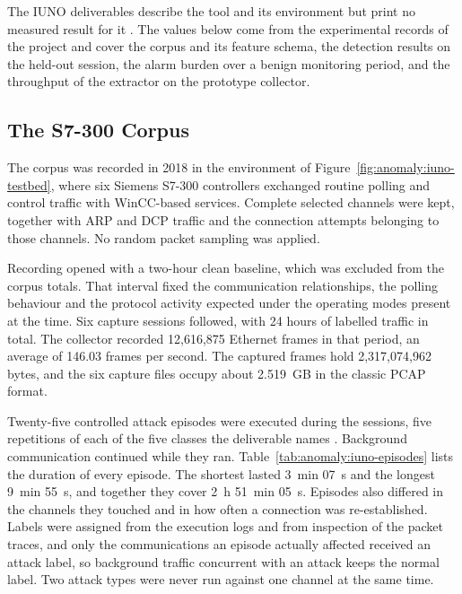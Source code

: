 The IUNO deliverables describe the tool and its environment but print no measured result for it
\cite{iuno_ap4}. The values below come from the experimental records of the project and cover
the corpus and its feature schema, the detection results on the held-out session, the alarm
burden over a benign monitoring period, and the throughput of the extractor on the prototype
collector.

\subsection{The S7-300 Corpus}
\label{sec:anomaly:iuno-corpus}

The corpus was recorded in 2018 in the environment of Figure~\ref{fig:anomaly:iuno-testbed},
where six Siemens S7-300 controllers exchanged routine polling and control traffic with
WinCC-based services. Complete selected channels were kept, together with ARP and DCP traffic and
the connection attempts belonging to those channels. No random packet sampling was applied.

Recording opened with a two-hour clean baseline, which was excluded from the corpus totals. That
interval fixed the communication relationships, the polling behaviour and the protocol activity
expected under the operating modes present at the time. Six capture sessions followed, with 24
hours of labelled traffic in total. The collector recorded 12,616,875 Ethernet frames in that
period, an average of 146.03 frames per second. The captured frames hold 2,317,074,962 bytes,
and the six capture files occupy about 2.519~GB in the classic PCAP format.

Twenty-five controlled attack episodes were executed during the sessions, five repetitions of
each of the five classes the deliverable names \cite{iuno_ap4}. Background communication
continued while they ran. Table~\ref{tab:anomaly:iuno-episodes} lists the duration of every
episode. The shortest lasted 3~min 07~s and the longest 9~min 55~s, and together they cover
2~h 51~min 05~s. Episodes also differed in the channels they touched and in how often a
connection was re-established. Labels were assigned
from the execution logs and from inspection of the packet traces, and only the communications an
episode actually affected received an attack label, so background traffic concurrent with an
attack keeps the normal label. Two attack types were never run against one channel at the same
time.

